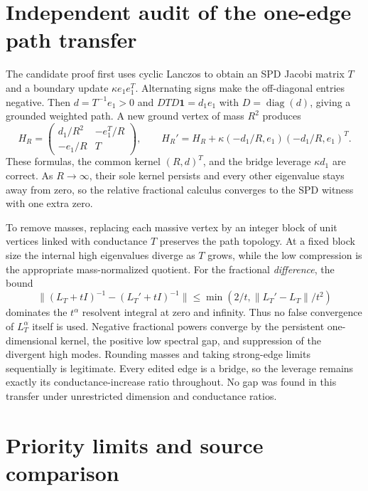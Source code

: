 \documentclass[11pt]{article}
\newcommand{\diag}{\operatorname{diag}}
\newcommand{\norm}[1]{\lVert#1\rVert}
\begin{document}
\section{Independent audit of the one-edge path transfer}\label{sec:audit}

The candidate proof first uses cyclic Lanczos to obtain an SPD Jacobi
matrix $T$ and a boundary update $\kappa e_1e_1^T$. Alternating signs
make the off-diagonal entries negative. Then $d=T^{-1}e_1>0$ and
$D T D\mathbf1=d_1e_1$ with $D=\diag(d)$, giving a grounded weighted
path. A new ground vertex of mass $R^2$ produces
\[
 H_R=\begin{pmatrix}d_1/R^2&-e_1^T/R\\-e_1/R&T\end{pmatrix},\qquad
 H_R'=H_R+\kappa(-d_1/R,e_1)(-d_1/R,e_1)^T.
\]
These formulas, the common kernel $(R,d)^T$, and the bridge leverage
$\kappa d_1$ are correct. As $R\to\infty$, their sole kernel persists
and every other eigenvalue stays away from zero, so the relative
fractional calculus converges to the SPD witness with one extra zero.

To remove masses, replacing each massive vertex by an integer block of
unit vertices linked with conductance $T$ preserves the path topology.
At a fixed block size the internal high eigenvalues diverge as $T$ grows,
while the low compression is the appropriate mass-normalized quotient.
For the fractional \emph{difference}, the bound
\[
 \norm{(L_T+tI)^{-1}-(L_T'+tI)^{-1}}
       \le\min(2/t,\norm{L_T'-L_T}/t^2)
\]
dominates the $t^\alpha$ resolvent integral at zero and infinity.
Thus no false convergence of $L_T^\alpha$ itself is used. Negative
fractional powers converge by the persistent one-dimensional kernel,
the positive low spectral gap, and suppression of the divergent high
modes. Rounding masses and taking strong-edge limits sequentially is
legitimate. Every edited edge is a bridge, so the leverage remains exactly
its conductance-increase ratio throughout. No gap was found in this
transfer under unrestricted dimension and conductance ratios.

\section{Priority limits and source comparison}
\end{document}
